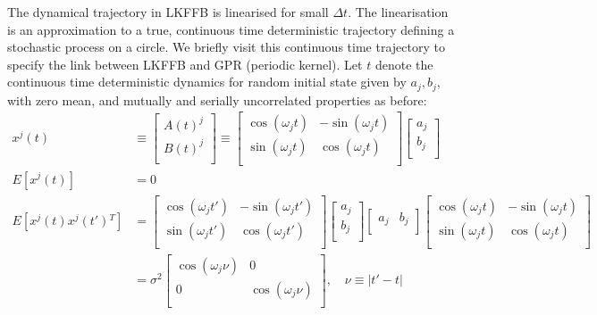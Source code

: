 The dynamical trajectory in LKFFB is linearised for small $\Delta t$.  The linearisation is an approximation to a true, continuous time deterministic trajectory defining a stochastic process on a circle. We briefly visit this continuous time trajectory to specify the link between LKFFB and GPR (periodic kernel). Let $t$ denote the continuous time deterministic dynamics for random initial state given by $a_j, b_j$, with zero mean, and mutually and serially uncorrelated properties as before:
\begin{align}
x^j(t) & \equiv \begin{bmatrix} A(t)^j \\ B(t)^j \\ \end{bmatrix} \equiv \begin{bmatrix} \cos(\omega_j t) & -\sin(\omega_j t) \\ \sin(\omega_j t) & \cos(\omega_j t) \\ \end{bmatrix} \begin{bmatrix} a_j \\ b_j \\ \end{bmatrix} \\
E[x^j(t)]&= 0 \\%
E[x^j(t) x^j(t'){}^T]&= \begin{bmatrix} \cos(\omega_j t') & -\sin(\omega_j t') \\ \sin(\omega_jt') & \cos(\omega_jt') \\ \end{bmatrix} \begin{bmatrix} a_j \\ b_j \\ \end{bmatrix} \begin{bmatrix} a_j & b_j \\ \end{bmatrix} \begin{bmatrix} \cos(\omega_j t) & -\sin(\omega_j t) \\ \sin(\omega_j t) & \cos(\omega_j t) \\ \end{bmatrix} \\ 
&=\sigma^2 \begin{bmatrix} 
\cos(\omega_j\nu) & 0 \\ 
0 & \cos(\omega_j\nu)  \\
\end{bmatrix}, \quad \nu \equiv |t'-t| \label{eqn:cov_circle}
\end{align}

